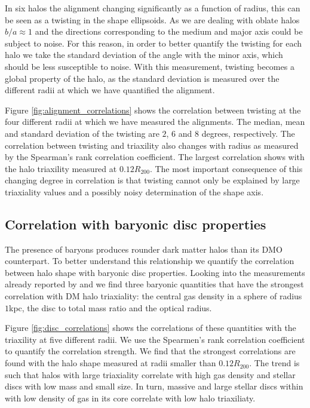 \documentclass[usenatbib]{mnras}
\begin{document}
In six halos the alignment changing significantly as a function of radius, this can be seen as a twisting in the shape ellipsoids. 
As we are dealing with oblate halos $b/a\approx 1$ and the
directions corresponding to the medium and major axis could be subject
to noise.
For this reason, in order to better quantify the twisting for each
halo we take the standard deviation of the angle with the minor
axis, which should be less susceptible to noise.
With this measurement, twisting becomes a global property of the halo,
as the standard deviation is measured over the different radii at
which we have quantified the alignment.

Figure \ref{fig:alignment_correlations} shows the correlation between
twisting at the four different radii at which we have measured the
alignments. 
The median, mean and standard deviation of the twisting are $2$, $6$ and $8$ degrees, respectively.
The correlation between twisting and triaxility also changes with
radius as measured by the Spearman's rank correlation coefficient.
The largest correlation shows with the halo triaxility measured at
$0.12R_{200}$. 
The most important consequence of this changing degree in correlation
is that twisting cannot only be explained by large triaxiality values
and a possibly noisy determination of the shape axis.

\subsection{Correlation with baryonic disc properties}


The presence of baryons produces rounder dark matter halos than its DMO
counterpart.
To better understand this relationship we quantify the correlation
between halo shape with baryonic disc properties.  
Looking into the measurements already reported by \cite{auriga} and
\cite{Pakmor17} we find three baryonic quantities that have the
strongest correlation with DM halo triaxiality: the central gas
density in a sphere of radius $1$kpc, the disc to total mass ratio and
the optical radius. 

Figure \ref{fig:disc_correlations} shows the correlations of
these quantities with the triaxility at five different radii.
We use the Spearmen's rank correlation coefficient to quantify the
correlation strength.
We find that the strongest correlations are found with the halo shape
measured at radii smaller than $0.12R_{200}$.
The  trend is such that halos with large triaxiality correlate with
high gas density and stellar discs with low mass and small size. 
In turn, massive and large stellar discs within with low density of
gas in its core correlate with low halo triaxiliaty. 
\end{document}

